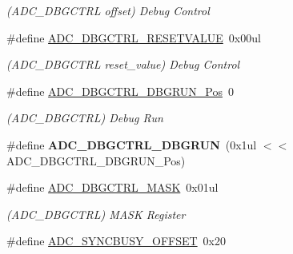 \begin{DoxyCompactItemize}
\begin{DoxyCompactList}\small\item\em (A\+D\+C\+\_\+\+D\+B\+G\+C\+T\+R\+L offset) Debug Control \end{DoxyCompactList}\item 
\hypertarget{group___s_a_m_l21___a_d_c_ga55a5b2cca3961a9c17812caed2bcbe5a}{}\#define \hyperlink{group___s_a_m_l21___a_d_c_ga55a5b2cca3961a9c17812caed2bcbe5a}{A\+D\+C\+\_\+\+D\+B\+G\+C\+T\+R\+L\+\_\+\+R\+E\+S\+E\+T\+V\+A\+L\+U\+E}~0x00ul\label{group___s_a_m_l21___a_d_c_ga55a5b2cca3961a9c17812caed2bcbe5a}

\begin{DoxyCompactList}\small\item\em (A\+D\+C\+\_\+\+D\+B\+G\+C\+T\+R\+L reset\+\_\+value) Debug Control \end{DoxyCompactList}\item 
\hypertarget{group___s_a_m_l21___a_d_c_ga6efae94a5c4156ab6bddff706917eca0}{}\#define \hyperlink{group___s_a_m_l21___a_d_c_ga6efae94a5c4156ab6bddff706917eca0}{A\+D\+C\+\_\+\+D\+B\+G\+C\+T\+R\+L\+\_\+\+D\+B\+G\+R\+U\+N\+\_\+\+Pos}~0\label{group___s_a_m_l21___a_d_c_ga6efae94a5c4156ab6bddff706917eca0}

\begin{DoxyCompactList}\small\item\em (A\+D\+C\+\_\+\+D\+B\+G\+C\+T\+R\+L) Debug Run \end{DoxyCompactList}\item 
\hypertarget{group___s_a_m_l21___a_d_c_ga33563d6e39e08d16bec4b765489de2d9}{}\#define {\bfseries A\+D\+C\+\_\+\+D\+B\+G\+C\+T\+R\+L\+\_\+\+D\+B\+G\+R\+U\+N}~(0x1ul $<$$<$ A\+D\+C\+\_\+\+D\+B\+G\+C\+T\+R\+L\+\_\+\+D\+B\+G\+R\+U\+N\+\_\+\+Pos)\label{group___s_a_m_l21___a_d_c_ga33563d6e39e08d16bec4b765489de2d9}

\item 
\hypertarget{group___s_a_m_l21___a_d_c_gab25e0ee29c51fdfc76ba7fc828fd5c0a}{}\#define \hyperlink{group___s_a_m_l21___a_d_c_gab25e0ee29c51fdfc76ba7fc828fd5c0a}{A\+D\+C\+\_\+\+D\+B\+G\+C\+T\+R\+L\+\_\+\+M\+A\+S\+K}~0x01ul\label{group___s_a_m_l21___a_d_c_gab25e0ee29c51fdfc76ba7fc828fd5c0a}

\begin{DoxyCompactList}\small\item\em (A\+D\+C\+\_\+\+D\+B\+G\+C\+T\+R\+L) M\+A\+S\+K Register \end{DoxyCompactList}\item 
\hypertarget{group___s_a_m_l21___a_d_c_ga428ab5147cbdfc744547b636ee655019}{}\#define \hyperlink{group___s_a_m_l21___a_d_c_ga428ab5147cbdfc744547b636ee655019}{A\+D\+C\+\_\+\+S\+Y\+N\+C\+B\+U\+S\+Y\+\_\+\+O\+F\+F\+S\+E\+T}~0x20\label{group___s_a_m_l21___a_d_c_ga428ab5147cbdfc744547b636ee655019}


\end{DoxyCompactItemize}
